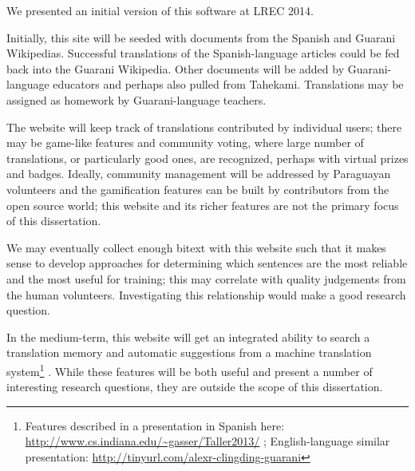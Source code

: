 We presented an initial version of this software at LREC
2014\cite{RUDNICK14.151}.

Initially, this site will be seeded with documents from the Spanish and Guarani
Wikipedias. Successful translations of the Spanish-language articles could be
fed back into the Guarani Wikipedia. Other documents will be added by
Guarani-language educators and perhaps also pulled from Tahekami. Translations
may be assigned as homework by Guarani-language teachers.

The website will keep track of translations contributed by individual users;
there may be game-like features and community voting, where large number of
translations, or particularly good ones, are recognized, perhaps with virtual
prizes and badges.
Ideally, community management will be addressed by Paraguayan volunteers and
the gamification features can be built by contributors from the open source
world; this website and its richer features are not the primary focus of this
dissertation.

We may eventually collect enough bitext with this website such that it makes
sense to develop approaches for determining which sentences are the most
reliable and the most useful for training; this may correlate with quality
judgements from the human volunteers.
Investigating this relationship would make a good research question.

In the medium-term, this website will get an integrated ability to search
a translation memory and automatic suggestions from a machine translation
system\footnote{Features described in a presentation in Spanish here:
\url{http://www.cs.indiana.edu/~gasser/Taller2013/} ; English-language similar
presentation: \url{http://tinyurl.com/alexr-clingding-guarani} }
. While these features will be both useful and present a number of
interesting research questions, they are outside the scope of this
dissertation.
